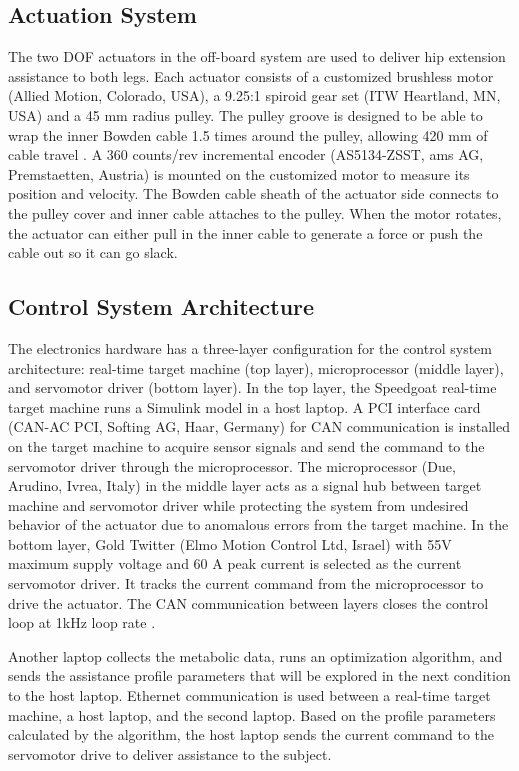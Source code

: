 \subsection*{Actuation System}
The two DOF actuators in the off-board system are used to deliver hip extension assistance to both legs. Each actuator consists of a customized brushless motor (Allied Motion, Colorado, USA), a 9.25:1 spiroid gear set (ITW Heartland, MN, USA) and a 45 mm radius pulley. The pulley groove is designed to be able to wrap the inner Bowden cable 1.5 times around the pulley, allowing 420 mm of cable travel \citep{Lee2018}. A 360 counts/rev incremental encoder (AS5134-ZSST, ams AG, Premstaetten, Austria) is mounted on the customized motor to measure its position and velocity. The Bowden cable sheath of the actuator side connects to the pulley cover and inner cable attaches to the pulley. When the motor rotates, the actuator can either pull in the inner cable to generate a force or push the cable out so it can go slack.

\subsection*{Control System Architecture}
The electronics hardware has a three-layer configuration for the control system architecture: real-time target machine (top layer), microprocessor (middle layer), and servomotor driver (bottom layer). In the top layer, the Speedgoat real-time target machine runs a Simulink model in a host laptop. A PCI interface card (CAN-AC PCI, Softing AG, Haar, Germany) for CAN communication is installed on the target machine to acquire sensor signals and send the command to the servomotor driver through the microprocessor. The microprocessor (Due, Arudino, Ivrea, Italy) in the middle layer acts as a signal hub between target machine and servomotor driver while protecting the system from undesired behavior of the actuator due to anomalous errors from the target machine. In the bottom layer, Gold Twitter (Elmo Motion Control Ltd, Israel) with 55V maximum supply voltage and 60 A peak current is selected as the current servomotor driver. It tracks the current command from the microprocessor to drive the actuator. The CAN communication between layers closes the control loop at 1kHz loop rate \citep{Lee2018}.

Another laptop collects the metabolic data, runs an optimization algorithm, and sends the assistance profile parameters that will be explored in the next condition to the host laptop. Ethernet communication is used between a real-time target machine, a host laptop, and the second laptop. Based on the profile parameters calculated by the algorithm, the host laptop sends the current command to the servomotor drive to deliver assistance to the subject.

